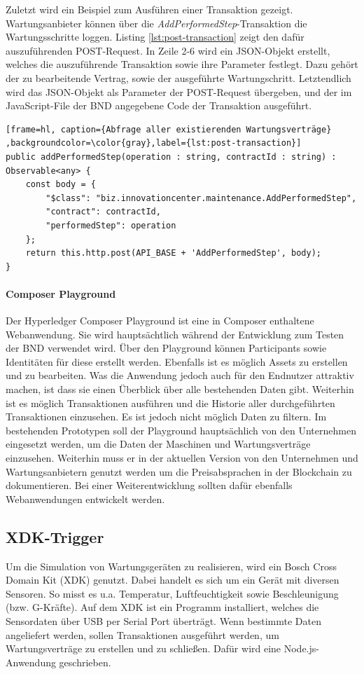 Zuletzt wird ein Beispiel zum Ausführen einer Transaktion gezeigt. Wartungsanbieter können über die \textit{AddPerformedStep}-Transaktion die Wartungsschritte loggen. Listing \ref{lst:post-transaction} zeigt den dafür auszuführenden POST-Request. In Zeile 2-6 wird ein JSON-Objekt erstellt, welches die auszuführende Transaktion sowie ihre Parameter festlegt. Dazu gehört der zu bearbeitende Vertrag, sowie der ausgeführte Wartungschritt. Letztendlich wird das JSON-Objekt als Parameter der POST-Request übergeben, und der im JavaScript-File der \acs{BND} angegebene Code der Transaktion ausgeführt.

\begin{lstfloat}
\begin{lstlisting}[frame=hl, caption={Abfrage aller existierenden Wartungsverträge} ,backgroundcolor=\color{gray},label={lst:post-transaction}]
public addPerformedStep(operation : string, contractId : string) : Observable<any> {
    const body = {
        "$class": "biz.innovationcenter.maintenance.AddPerformedStep",
        "contract": contractId,
        "performedStep": operation
    };
    return this.http.post(API_BASE + 'AddPerformedStep', body);
}
\end{lstlisting} 
\end{lstfloat}

\paragraph{Composer Playground}
Der Hyperledger Composer Playground ist eine in Composer enthaltene Webanwendung. Sie wird hauptsächtlich während der Entwicklung zum Testen der \acs{BND} verwendet wird. Über den Playground können Participants sowie Identitäten für diese erstellt werden. Ebenfalls ist es möglich Assets zu erstellen und zu bearbeiten. Was die Anwendung jedoch auch für den Endnutzer attraktiv machen, ist dass sie einen Überblick über alle bestehenden Daten gibt. Weiterhin ist es möglich Transaktionen ausführen und die Historie aller durchgeführten Transaktionen einzusehen. Es ist jedoch nicht möglich Daten zu filtern. Im bestehenden Prototypen soll der Playground hauptsächlich von den Unternehmen eingesetzt werden, um die Daten der Maschinen und Wartungsverträge einzusehen. Weiterhin muss er in der aktuellen Version von den Unternehmen und Wartungsanbietern genutzt werden um die Preisabsprachen in der Blockchain zu dokumentieren. Bei einer Weiterentwicklung sollten dafür ebenfalls Webanwendungen entwickelt werden.

\subsection{XDK-Trigger}
Um die Simulation von Wartungsgeräten zu realisieren, wird ein Bosch Cross Domain Kit (XDK) genutzt. Dabei handelt es sich um ein Gerät mit diversen Sensoren. So misst es u.a. Temperatur, Luftfeuchtigkeit sowie Beschleunigung (bzw. G-Kräfte). Auf dem XDK ist ein Programm installiert, welches die Sensordaten über USB per Serial Port überträgt. Wenn bestimmte Daten angeliefert werden, sollen Transaktionen ausgeführt werden, um Wartungsverträge zu erstellen und zu schließen. Dafür wird eine Node.js-Anwendung geschrieben.

